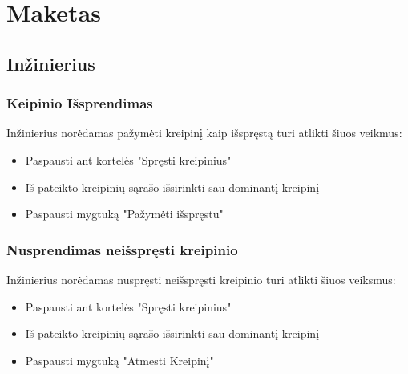 
\section{Maketas}

\subsection{Inžinierius}
	
	
	

	\subsubsection{Keipinio Išsprendimas}
	
	Inžinierius norėdamas pažymėti kreipinį kaip išspręstą turi atlikti šiuos veikmus:
	\begin{itemize}
		\item Paspausti ant kortelės "Spręsti kreipinius" 
		\item Iš pateikto kreipinių sąrašo išsirinkti sau dominantį kreipinį 
		\item Paspausti mygtuką "Pažymėti išspręstu" 
	\end{itemize}
	
	\subsubsection{Nusprendimas neišspręsti kreipinio}
	
	Inžinierius norėdamas nuspręsti neišspręsti kreipinio turi atlikti šiuos veiksmus:
	
	\begin{itemize}
		\item Paspausti ant kortelės "Spręsti kreipinius" 
		\item Iš pateikto kreipinių sąrašo išsirinkti sau dominantį kreipinį 
		\item Paspausti mygtuką "Atmesti Kreipinį" 
	\end{itemize}
	
